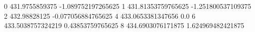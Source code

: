 0 431.9755859375 -1.089752197265625
1 431.81353759765625 -1.251800537109375
2 432.98828125 -0.077056884765625
4 433.0653381347656 0.0
6 433.5038757324219 0.43853759765625
8 434.6903076171875 1.624969482421875
